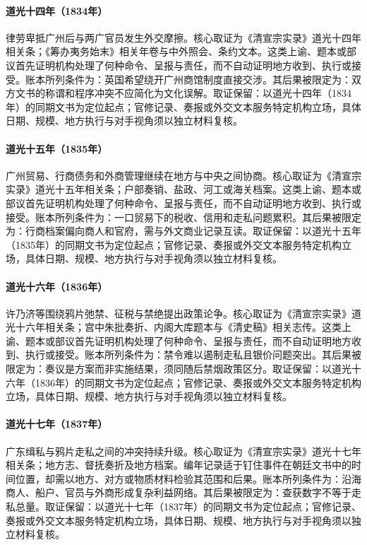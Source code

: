 \hypertarget{ledger:EQ-1834-NAPIER-AFFAIR}{}\paragraph{道光十四年（1834年）}律劳卑抵广州后与两广官员发生外交摩擦。核心取证为《清宣宗实录》道光十四年相关条；《筹办夷务始末》相关年卷与中外照会、条约文本。这类上谕、题本或部议首先证明机构处理了何种命令、呈报与责任，而不自动证明地方收到、执行或接受。账本所列条件为：英国希望绕开广州商馆制度直接交涉。其后果被限定为：双方文书的称谓和程序冲突不应简化为文化误解。取证保留：以道光十四年（1834年）的同期文书为定位起点；官修记录、奏报或外交文本服务特定机构立场，具体日期、规模、地方执行与对手视角须以独立材料复核。
\hypertarget{ledger:EQ-1835-GUANGZHOU-TRADE-REGULATION}{}\paragraph{道光十五年（1835年）}广州贸易、行商债务和外商管理继续在地方与中央之间协商。核心取证为《清宣宗实录》道光十五年相关条；户部奏销、盐政、河工或海关档案。这类上谕、题本或部议首先证明机构处理了何种命令、呈报与责任，而不自动证明地方收到、执行或接受。账本所列条件为：一口贸易下的税收、信用和走私问题累积。其后果被限定为：行商档案偏向商人和官府，需与外文商业记录互读。取证保留：以道光十五年（1835年）的同期文书为定位起点；官修记录、奏报或外交文本服务特定机构立场，具体日期、规模、地方执行与对手视角须以独立材料复核。
\hypertarget{ledger:EQ-1836-OPIUM-LEGALIZATION-DEBATE}{}\paragraph{道光十六年（1836年）}许乃济等围绕鸦片弛禁、征税与禁绝提出政策论争。核心取证为《清宣宗实录》道光十六年相关条；宫中朱批奏折、内阁大库题本与《清史稿》相关志传。这类上谕、题本或部议首先证明机构处理了何种命令、呈报与责任，而不自动证明地方收到、执行或接受。账本所列条件为：禁令难以遏制走私且银价问题突出。其后果被限定为：奏议是方案而非实施结果，须同随后禁烟政策区分。取证保留：以道光十六年（1836年）的同期文书为定位起点；官修记录、奏报或外交文本服务特定机构立场，具体日期、规模、地方执行与对手视角须以独立材料复核。
\hypertarget{ledger:EQ-1837-CANTON-SMUGGLING}{}\paragraph{道光十七年（1837年）}广东缉私与鸦片走私之间的冲突持续升级。核心取证为《清宣宗实录》道光十七年相关条；地方志、督抚奏折及地方档案。编年记录适于钉住事件在朝廷文书中的时间位置，却需以地方、对方或物质材料检验其范围和后果。账本所列条件为：沿海商人、船户、官员与外商形成复杂利益网络。其后果被限定为：查获数字不等于走私总量。取证保留：以道光十七年（1837年）的同期文书为定位起点；官修记录、奏报或外交文本服务特定机构立场，具体日期、规模、地方执行与对手视角须以独立材料复核。
